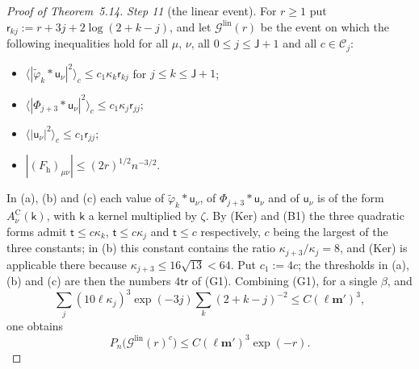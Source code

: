 \documentclass[11pt,letterpaper,reqno]{amsart}
\theoremstyle{definition}
\begin{document}
\begin{proof}[Proof of Theorem~5.14]
\emph{Step 11} (the linear event).
For $r\ge1$ put $\mathsf r_{kj}:=r+3j+2\log(2+k-j)$, and let $\mathcal G^{\mathrm{lin}}(r)$ be the event on which the following inequalities hold for all $\mu$, $\nu$, all $0\le j\le\mathsf J+1$ and all $c\in\mathcal C_j$:
\begin{itemize}
\item[(a)] $\langle|\tilde\varphi_k*\mathsf u_\nu|^2\rangle_c\le c_1\kappa_k\mathsf r_{kj}$ for $j\le k\le\mathsf J+1$;
\item[(b)] $\langle|\Phi_{j+3}*\mathsf u_\nu|^2\rangle_c\le c_1\kappa_j\mathsf r_{jj}$;
\item[(c)] $\langle|\mathsf u_\nu|^2\rangle_c\le c_1\mathsf r_{jj}$;
\item[(d)] $|(F_{\mathrm h})_{\mu\nu}|\le(2r)^{1/2}n^{-3/2}$.
\end{itemize}
In (a), (b) and (c) each value of $\tilde\varphi_k*\mathsf u_\nu$, of $\Phi_{j+3}*\mathsf u_\nu$ and of $\mathsf u_\nu$ is of the form $A^{\mathrm C}_\nu(\mathsf k)$, with $\mathsf k$ a kernel multiplied by $\zeta$.
By (Ker) and (B1) the three quadratic forms admit $\mathsf t\le c\kappa_k$, $\mathsf t\le c\kappa_j$ and $\mathsf t\le c$ respectively, $c$ being the largest of the three constants;
in (b) this constant contains the ratio $\kappa_{j+3}/\kappa_j=8$, and (Ker) is applicable there because $\kappa_{j+3}\le16\sqrt{13}<64$.
Put $c_1:=4c$;
the thresholds in (a), (b) and (c) are then the numbers $4\mathsf t\mathsf r$ of (G1).
Combining (G1), \cite[Theorem~6.27\,(c)]{QEDII} for a single $\beta$, and
\begin{equation*}
\sum_j(10\ell\kappa_j)^3\exp(-3j)\sum_k(2+k-j)^{-2}\le C(\ell\mathbf m')^3,
\end{equation*}
one obtains
\begin{equation*}
P_n\bigl(\mathcal G^{\mathrm{lin}}(r)^c\bigr)\le C(\ell\mathbf m')^3\exp(-r).
\end{equation*}


\end{proof}
\end{document}
